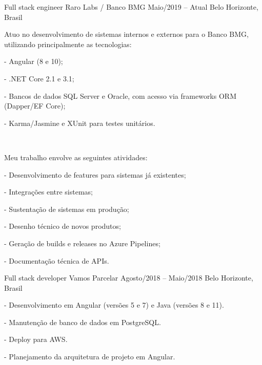 \documentclass[10pt,a4paper]{styling}
\begin{document}
\tagline{}

%

\begin{fullwidth}
\makecvheader
\end{fullwidth}

%





\cvevent
{ Full stack engineer }
{Raro Labs / Banco BMG}
{Maio/2019 -- Atual}
{Belo Horizonte, Brasil}

{
Atuo no desenvolvimento de sistemas internos e externos para o Banco BMG, utilizando principalmente as tecnologias:

- Angular (8 e 10);

- .NET Core 2.1 e 3.1;

- Bancos de dados SQL Server e Oracle, com acesso via frameworks ORM (Dapper/EF Core);

- Karma/Jasmine e XUnit para testes unitários.
}
\\[1\baselineskip]
{
Meu trabalho envolve as seguintes atividades:

- Desenvolvimento de features para sistemas já existentes;

- Integrações entre sistemas;

- Sustentação de sistemas em produção;

- Desenho técnico de novos produtos;

- Geração de builds e releases no Azure Pipelines;

- Documentação técnica de APIs.
}

\divider

\cvevent
{Full stack developer}
{Vamos Parcelar}
{Agosto/2018 -- Maio/2018}
{Belo Horizonte, Brasil}

- Desenvolvimento em Angular (versões 5 e 7) e Java (versões 8 e 11).

- Manutenção de banco de dados em PostgreSQL.

- Deploy para AWS.

- Planejamento da arquitetura de projeto em Angular.
\end{document}
